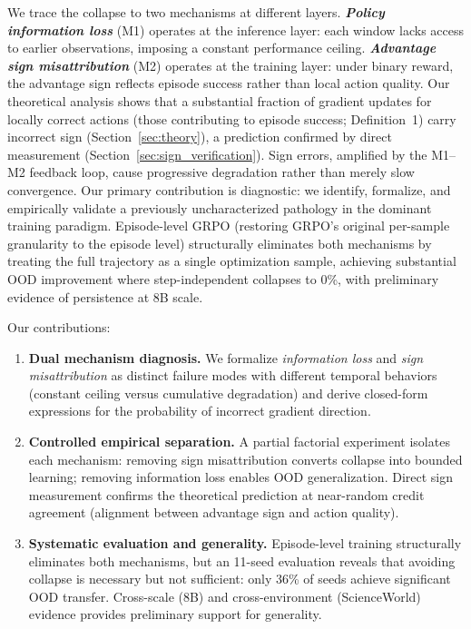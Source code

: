 We trace the collapse to two mechanisms at different layers. \textit{\textbf{Policy information loss}} (M1) operates at the inference layer: each window lacks access to earlier observations, imposing a constant performance ceiling. \textit{\textbf{Advantage sign misattribution}} (M2) operates at the training layer: under binary reward, the advantage sign reflects episode success rather than local action quality. Our theoretical analysis shows that a substantial fraction of gradient updates for locally correct actions (those contributing to episode success; Definition~1) carry incorrect sign (Section~\ref{sec:theory}), a prediction confirmed by direct measurement (Section~\ref{sec:sign_verification}). Sign errors, amplified by the M1--M2 feedback loop, cause progressive degradation rather than merely slow convergence. Our primary contribution is diagnostic: we identify, formalize, and empirically validate a previously uncharacterized pathology in the dominant training paradigm. Episode-level GRPO (restoring GRPO's original per-sample granularity to the episode level) structurally eliminates both mechanisms by treating the full trajectory as a single optimization sample, achieving substantial OOD improvement where step-independent collapses to 0\%, with preliminary evidence of persistence at 8B scale.

Our contributions:
\begin{enumerate}[nosep,leftmargin=*]
\item \textbf{Dual mechanism diagnosis.} We formalize \textit{information loss} and \textit{sign misattribution} as distinct failure modes with different temporal behaviors (constant ceiling versus cumulative degradation) and derive closed-form expressions for the probability of incorrect gradient direction.
\item \textbf{Controlled empirical separation.} A partial factorial experiment isolates each mechanism: removing sign misattribution converts collapse into bounded learning; removing information loss enables OOD generalization. Direct sign measurement confirms the theoretical prediction at near-random credit agreement (alignment between advantage sign and action quality).
\item \textbf{Systematic evaluation and generality.} Episode-level training structurally eliminates both mechanisms, but an 11-seed evaluation reveals that avoiding collapse is necessary but not sufficient: only 36\% of seeds achieve significant OOD transfer. Cross-scale (8B) and cross-environment (ScienceWorld) evidence provides preliminary support for generality.
\end{enumerate}
